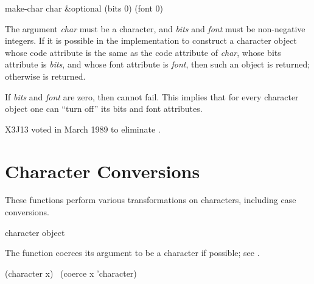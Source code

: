 \begin{obsolete}
\begin{defun}[Function]
make-char char &optional (bits 0) (font 0)

The argument {\it char} must be a character,
and {\it bits} and {\it font} must be non-negative integers.
If it is possible in the implementation to construct a character
object whose code attribute is the same as
the code attribute of {\it char},
whose bits attribute is {\it bits},
and whose font attribute is {\it font}, then such an object is returned;
otherwise {\false} is returned.

If {\it bits} and {\it font} are zero, then  cannot fail.
This implies that for every character object one can ``turn off''
its bits and font attributes.
\end{defun}
\end{obsolete}

\begin{newer}
X3J13 voted in March 1989 
to eliminate .
\end{newer}

\section{Character Conversions}


These functions perform various transformations on characters,
including case conversions.

\begin{defun}[Function]
character object

The function  coerces its argument to be a character
if possible; see .
\begin{lisp}
(character x) \EQ\ (coerce x 'character)
\end{lisp}
\end{defun}


